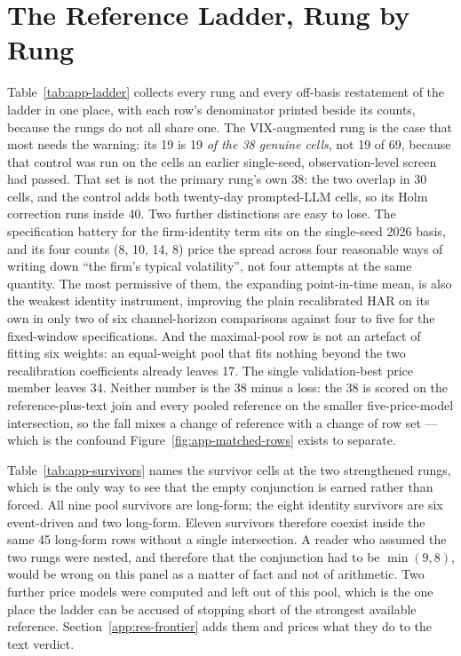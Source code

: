 \FloatBarrier
\section{The Reference Ladder, Rung by Rung}
\label{app:res-ladder}

Table~\ref{tab:app-ladder} collects every rung and every off-basis
restatement of the ladder in one place, with each row's denominator
printed beside its counts, because the rungs do not all share one. The
VIX-augmented rung is the case that most needs the warning: its 19 is
19 \emph{of the 38 genuine cells}, not 19 of 69, because that control
was run on the cells an earlier single-seed, observation-level screen had
passed. That set is not the primary rung's own 38: the two overlap in 30
cells, and the control adds both twenty-day prompted-LLM cells, so its
Holm correction runs inside 40.
Two further
distinctions are easy to lose. The specification battery for the
firm-identity term sits on the single-seed 2026 basis, and its four
counts (8, 10, 14, 8) price the spread across four reasonable ways of
writing down ``the firm's typical volatility'', not four attempts at the
same quantity. The most permissive of them, the expanding
point-in-time mean, is also the weakest identity instrument, improving
the plain recalibrated HAR on its own in only two of six channel-horizon
comparisons against four to five for the fixed-window specifications.
And the maximal-pool row is not an artefact of fitting six weights: an
equal-weight pool that fits nothing beyond the two recalibration
coefficients already leaves 17. The
single validation-best price member leaves 34. Neither number is the 38 minus a
loss: the 38 is scored on the reference-plus-text join and every pooled
reference on the smaller five-price-model intersection, so the fall mixes a
change of reference with a change of row set --- which is the confound
Figure~\ref{fig:app-matched-rows} exists to separate.

Table~\ref{tab:app-survivors} names the survivor cells at the two
strengthened rungs, which is the only way to see that the empty
conjunction is earned rather than forced. All nine pool survivors are
long-form; the eight identity survivors are six event-driven and two
long-form. Eleven survivors therefore coexist inside the same 45
long-form rows without a single intersection. A reader who assumed the
two rungs were nested, and therefore that the conjunction had to be
$\min(9,8)$, would be wrong on this panel as a matter of fact and not
of arithmetic.
Two further price models were computed and left out of this pool, which is the
one place the ladder can be accused of stopping short of the strongest
available reference. Section~\ref{app:res-frontier} adds them and prices what
they do to the text verdict.

